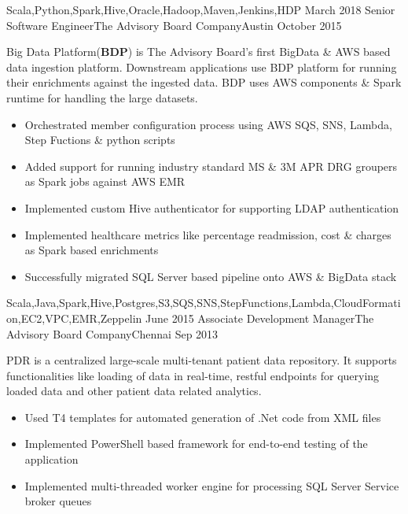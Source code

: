 \begin{experiences}
{\begin{itemize}
                      \end{itemize}
                    }
                    {Scala,Python,Spark,Hive,Oracle,Hadoop,Maven,Jenkins,HDP}
  \emptySeparator
  \experience
    {March 2018} {Senior Software Engineer}{The Advisory Board Company}{Austin}
    {October 2015}    
    			 {
    	              Big Data Platform(\textbf{BDP}) is The Advisory Board's first BigData \& AWS based data ingestion platform. Downstream applications use BDP platform for running their enrichments against the ingested data. BDP uses AWS components \& Spark runtime for handling the large datasets.
    	              \begin{itemize}
    	              	\item Orchestrated member configuration process using AWS SQS, SNS, Lambda, Step Fuctions \& python scripts                           
    	              	\item Added support for running industry standard MS \& 3M APR DRG groupers as Spark jobs against AWS EMR                        
    	              	\item Implemented custom Hive authenticator for supporting LDAP authentication  
    	              	\item Implemented healthcare metrics like percentage readmission, cost \& charges as Spark based enrichments                
    	              	\item Successfully migrated SQL Server based pipeline onto AWS \& BigData stack
    	              \end{itemize}
                  }
              {Scala,Java,Spark,Hive,Postgres,S3,SQS,SNS,StepFunctions,Lambda,CloudFormation,EC2,VPC,EMR,Zeppelin}
  \emptySeparator
  \experience
    {June 2015}     {Associate Development Manager}{The Advisory Board Company}{Chennai}
    {Sep 2013}    {
    	              PDR is a centralized large-scale multi-tenant patient data repository. It supports functionalities like loading of data in real-time, restful endpoints for querying loaded data and other patient data related analytics.
                      \begin{itemize}
                        \item Used T4 templates for automated generation of .Net code from XML files
                        \item Implemented PowerShell based framework for end-to-end testing of the application
                        \item Implemented multi-threaded worker engine for processing SQL Server Service broker queues

\end{itemize}}
\end{experiences}
